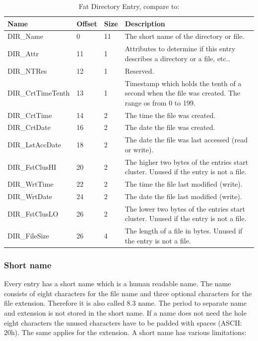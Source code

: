 \begin{table}[!ht]
\caption{Fat Directory Entry, compare to: \cite{usb_ms_jan, fatgen103}}
\centering
\begin{tabular}{|l|l|l|p{9cm}|}
\hline\hline
\textbf{Name} & \textbf{Offset} & \textbf{Size} & \textbf{Description}\\ \hline
DIR\_Name & 0 & 11 & The short name of the directory or file. \\ \hline
DIR\_Attr & 11 & 1 & Attributes to determine if this entry describes a directory or a file, etc.. \\ \hline
DIR\_NTRes & 12 & 1 & Reserved. \\ \hline
DIR\_CrtTimeTenth & 13 & 1 & Timestamp which holds the tenth of a second when the file was created. The range os from 0 to 199. \\ \hline
DIR\_CrtTime & 14 & 2 & The time the file was created. \\ \hline
DIR\_CrtDate & 16 & 2 & The date the file was created. \\ \hline
DIR\_LstAccDate & 18 & 2 & The date the file was last accessed (read or write). \\ \hline
DIR\_FstClusHI & 20 & 2 & The higher two bytes of the entries start cluster. Unused if the entry is not a file. \\ \hline
DIR\_WrtTime & 22 & 2 & The time the file last modified (write). \\ \hline
DIR\_WrtDate & 24 & 2 & The date the file last modified (write). \\ \hline
DIR\_FstClusLO & 26 & 2 & The lower two bytes of the entries start cluster. Unused if the entry is not a file. \\ \hline
DIR\_FileSize & 26 & 4 & The length of a file in bytes. Unused if the entry is not a file. \\ \hline
\end{tabular}
\label{table:fat_dir_entry}
\end{table}

\subsubsection{Short name}

Every entry has a short name which is a human readable name. The name consists of eight characters for the file name and three optional characters for the file extension. Therefore it is also called 8.3 name. The period to separate name and extension is not stored in the short name. If a name does not need the hole eight characters the unused characters have to be padded with spaces (ASCII: 20h). The same applies for the extension. A short name has various limitations\cite{usb_ms_jan}:

